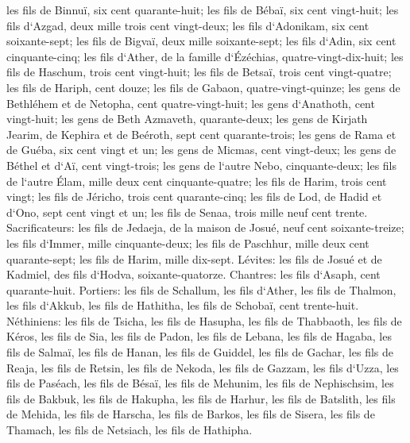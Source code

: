 \verse les fils de Binnuï, six cent quarante-huit; 
\verse les fils de Bébaï, six cent vingt-huit; 
\verse les fils d`Azgad, deux mille trois cent vingt-deux; 
\verse les fils d`Adonikam, six cent soixante-sept; 
\verse les fils de Bigvaï, deux mille soixante-sept; 
\verse les fils d`Adin, six cent cinquante-cinq; 
\verse les fils d`Ather, de la famille d`Ézéchias, quatre-vingt-dix-huit; 
\verse les fils de Haschum, trois cent vingt-huit; 
\verse les fils de Betsaï, trois cent vingt-quatre; 
\verse les fils de Hariph, cent douze; 
\verse les fils de Gabaon, quatre-vingt-quinze; 
\verse les gens de Bethléhem et de Netopha, cent quatre-vingt-huit; 
\verse les gens d`Anathoth, cent vingt-huit; 
\verse les gens de Beth Azmaveth, quarante-deux; 
\verse les gens de Kirjath Jearim, de Kephira et de Beéroth, sept cent quarante-trois; 
\verse les gens de Rama et de Guéba, six cent vingt et un; 
\verse les gens de Micmas, cent vingt-deux; 
\verse les gens de Béthel et d`Aï, cent vingt-trois; 
\verse les gens de l`autre Nebo, cinquante-deux; 
\verse les fils de l`autre Élam, mille deux cent cinquante-quatre; 
\verse les fils de Harim, trois cent vingt; 
\verse les fils de Jéricho, trois cent quarante-cinq; 
\verse les fils de Lod, de Hadid et d`Ono, sept cent vingt et un; 
\verse les fils de Senaa, trois mille neuf cent trente. 
\verse Sacrificateurs: les fils de Jedaeja, de la maison de Josué, neuf cent soixante-treize; 
\verse les fils d`Immer, mille cinquante-deux; 
\verse les fils de Paschhur, mille deux cent quarante-sept; 
\verse les fils de Harim, mille dix-sept. 
\verse Lévites: les fils de Josué et de Kadmiel, des fils d`Hodva, soixante-quatorze. 
\verse Chantres: les fils d`Asaph, cent quarante-huit. 
\verse Portiers: les fils de Schallum, les fils d`Ather, les fils de Thalmon, les fils d`Akkub, les fils de Hathitha, les fils de Schobaï, cent trente-huit. 
\verse Néthiniens: les fils de Tsicha, les fils de Hasupha, les fils de Thabbaoth, 
\verse les fils de Kéros, les fils de Sia, les fils de Padon, 
\verse les fils de Lebana, les fils de Hagaba, les fils de Salmaï, 
\verse les fils de Hanan, les fils de Guiddel, les fils de Gachar, 
\verse les fils de Reaja, les fils de Retsin, les fils de Nekoda, 
\verse les fils de Gazzam, les fils d`Uzza, les fils de Paséach, 
\verse les fils de Bésaï, les fils de Mehunim, les fils de Nephischsim, 
\verse les fils de Bakbuk, les fils de Hakupha, les fils de Harhur, 
\verse les fils de Batslith, les fils de Mehida, les fils de Harscha, 
\verse les fils de Barkos, les fils de Sisera, les fils de Thamach, 
\verse les fils de Netsiach, les fils de Hathipha. 
